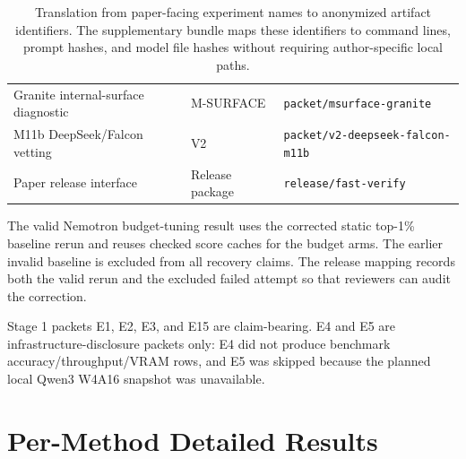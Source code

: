 \documentclass{article}
\begin{document}
\begin{table}[h]
{\begin{tabular}{@{}lll@{}}
Granite internal-surface diagnostic & M-SURFACE & \texttt{packet/msurface-granite} \\
M11b DeepSeek/Falcon vetting & V2 & \texttt{packet/v2-deepseek-falcon-m11b} \\
Paper release interface & Release package & \texttt{release/fast-verify} \\
\bottomrule
\end{tabular}}
\caption{Translation from paper-facing experiment names to anonymized artifact identifiers. The supplementary bundle maps these identifiers to command lines, prompt hashes, and model file hashes without requiring author-specific local paths.}
\end{table}

The valid Nemotron budget-tuning result uses the corrected static top-1\% baseline rerun and reuses checked score caches for the budget arms. The earlier invalid baseline is excluded from all recovery claims. The release mapping records both the valid rerun and the excluded failed attempt so that reviewers can audit the correction.

Stage 1 packets E1, E2, E3, and E15 are claim-bearing. E4 and E5 are
infrastructure-disclosure packets only: E4 did not produce benchmark
accuracy/throughput/VRAM rows, and E5 was skipped because the planned
local Qwen3 W4A16 snapshot was unavailable.

\section{Per-Method Detailed Results}
\label{app:method-details}
\end{document}
